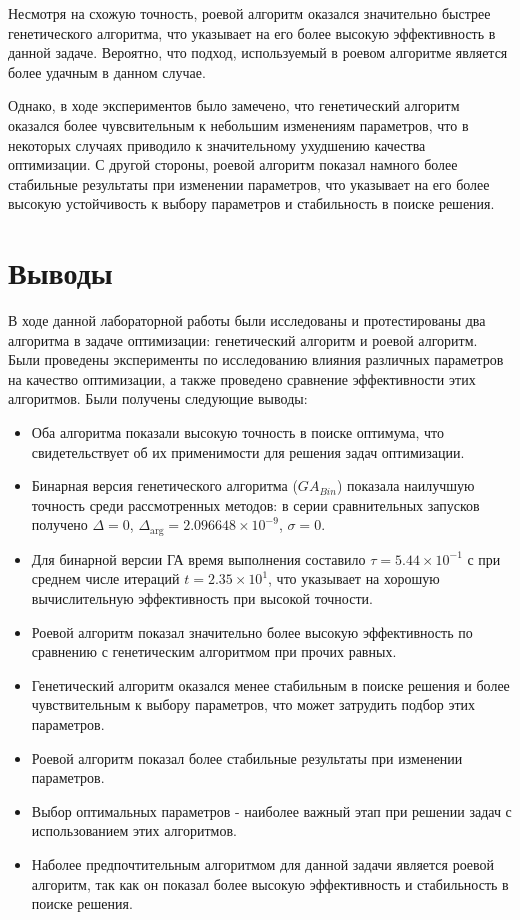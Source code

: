 \documentclass[12pt,a4paper]{article}
\begin{document}
Несмотря на схожую точность, роевой алгоритм оказался значительно быстрее генетического алгоритма, что указывает
на его более высокую эффективность в данной задаче. Вероятно, что подход, используемый в роевом алгоритме является
более удачным в данном случае.

Однако, в ходе экспериментов было замечено, что генетический алгоритм оказался более чувсвительным к небольшим
изменениям параметров, что в некоторых случаях приводило к значительному ухудшению качества оптимизации.
С другой стороны, роевой алгоритм показал намного более стабильные результаты  при изменении параметров, что
указывает на его более высокую устойчивость к выбору параметров и стабильность в поиске решения.

\section{Выводы}
В ходе данной лабораторной работы были исследованы и протестированы два алгоритма в задаче оптимизации:
генетический алгоритм и роевой алгоритм. Были проведены эксперименты по исследованию влияния
различных параметров на качество оптимизации, а также проведено сравнение эффективности этих алгоритмов.
Были получены следующие выводы:
\begin{itemize}
    \item Оба алгоритма показали высокую точность в поиске оптимума, что свидетельствует об их применимости для решения задач оптимизации.
    \item Бинарная версия генетического алгоритма ($GA_{Bin}$) показала наилучшую точность среди рассмотренных методов: в серии сравнительных запусков получено \(\Delta = 0\), \(\Delta_{\arg} = 2.096648 \times 10^{-9}\), \(\sigma = 0\).
    \item Для бинарной версии ГА время выполнения составило \(\tau = 5.44 \times 10^{-1}\) с при среднем числе итераций \(t = 2.35 \times 10^1\), что указывает на хорошую вычислительную эффективность при высокой точности.
    \item Роевой алгоритм показал значительно более высокую эффективность по сравнению с генетическим алгоритмом при прочих равных.
    \item Генетический алгоритм оказался менее стабильным в поиске решения и более чувствительным к выбору параметров, что может затрудить подбор этих параметров.
    \item Роевой алгоритм показал более стабильные результаты при изменении параметров.
    \item Выбор оптимальных параметров - наиболее важный этап при решении задач с использованием этих алгоритмов.
    \item Наболее предпочтительным алгоритмом для данной задачи является роевой алгоритм, так как он показал более высокую эффективность и стабильность в поиске решения.
\end{itemize}
\end{document}
